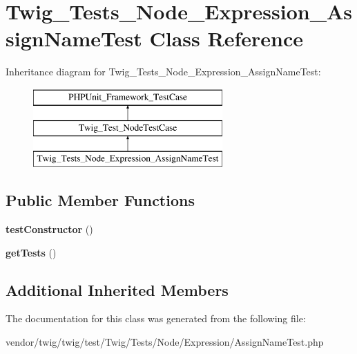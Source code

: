 \hypertarget{classTwig__Tests__Node__Expression__AssignNameTest}{}\section{Twig\+\_\+\+Tests\+\_\+\+Node\+\_\+\+Expression\+\_\+\+Assign\+Name\+Test Class Reference}
\label{classTwig__Tests__Node__Expression__AssignNameTest}
Inheritance diagram for Twig\+\_\+\+Tests\+\_\+\+Node\+\_\+\+Expression\+\_\+\+Assign\+Name\+Test\+:\begin{figure}[H]
\begin{center}
\leavevmode
\includegraphics[height=3.000000cm]{classTwig__Tests__Node__Expression__AssignNameTest}
\end{center}
\end{figure}
\subsection*{Public Member Functions}
\begin{DoxyCompactItemize}
\item 
{\bfseries test\+Constructor} ()\hypertarget{classTwig__Tests__Node__Expression__AssignNameTest_a8cb307ead72b359608e5c0c03c85354d}{}\label{classTwig__Tests__Node__Expression__AssignNameTest_a8cb307ead72b359608e5c0c03c85354d}

\item 
{\bfseries get\+Tests} ()\hypertarget{classTwig__Tests__Node__Expression__AssignNameTest_a3dfd6e50de954880b9451cc28f128aef}{}\label{classTwig__Tests__Node__Expression__AssignNameTest_a3dfd6e50de954880b9451cc28f128aef}

\end{DoxyCompactItemize}
\subsection*{Additional Inherited Members}


The documentation for this class was generated from the following file\+:\begin{DoxyCompactItemize}
\item 
vendor/twig/twig/test/\+Twig/\+Tests/\+Node/\+Expression/Assign\+Name\+Test.\+php\end{DoxyCompactItemize}
